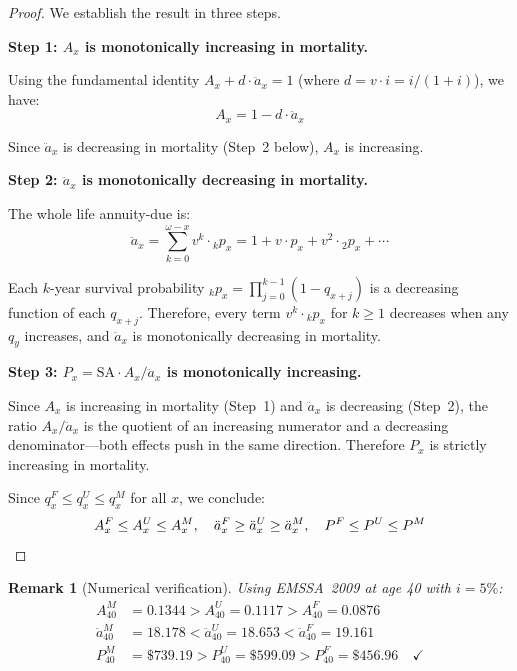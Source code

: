 \documentclass[12pt,a4paper]{article}
\newtheorem{remark}[definition]{Remark}
\newcommand{\qx}[1]{q_{#1}}
\newcommand{\Ax}[1]{A_{#1}}
\newcommand{\ax}[1]{\ddot{a}_{#1}}
\newcommand{\SA}{\text{SA}}
\begin{document}
\begin{proof}
We establish the result in three steps.

\textbf{Step 1: $\Ax{x}$ is monotonically increasing in mortality.}

Using the fundamental identity $\Ax{x} + d \cdot \ax{x} = 1$
(where $d = v \cdot i = i/(1+i)$), we have:
\begin{equation}
  \Ax{x} = 1 - d \cdot \ax{x}
\end{equation}

Since $\ax{x}$ is decreasing in mortality (Step~2 below), $\Ax{x}$ is increasing.

\textbf{Step 2: $\ax{x}$ is monotonically decreasing in mortality.}

The whole life annuity-due is:
\begin{equation}
  \ax{x} = \sum_{k=0}^{\omega - x} v^k \cdot {}_{k}p_x
  = 1 + v \cdot p_x + v^2 \cdot {}_{2}p_x + \cdots
\end{equation}

Each $k$-year survival probability ${}_{k}p_x = \prod_{j=0}^{k-1}(1 - \qx{x+j})$
is a decreasing function of each $\qx{x+j}$. Therefore, every term
$v^k \cdot {}_{k}p_x$ for $k \geq 1$ decreases when any $\qx{y}$ increases,
and $\ax{x}$ is monotonically decreasing in mortality.

\textbf{Step 3: $P_x = \SA \cdot \Ax{x} / \ax{x}$ is monotonically increasing.}

Since $\Ax{x}$ is increasing in mortality (Step~1) and $\ax{x}$ is decreasing
(Step~2), the ratio $\Ax{x} / \ax{x}$ is the quotient of an increasing
numerator and a decreasing denominator---both effects push in the same
direction. Therefore $P_x$ is strictly increasing in mortality.

Since $\qx{x}^F \leq \qx{x}^U \leq \qx{x}^M$ for all $x$, we conclude:
\begin{equation}
  \Ax{x}^F \leq \Ax{x}^U \leq \Ax{x}^M, \quad
  \ax{x}^F \geq \ax{x}^U \geq \ax{x}^M, \quad
  P^F \leq P^U \leq P^M \qedhere
\end{equation}
\end{proof}

\begin{remark}[Numerical verification]
Using EMSSA~2009 at age 40 with $i = 5\%$:
\begin{align*}
  \Ax{40}^M &= 0.1344 > \Ax{40}^U = 0.1117 > \Ax{40}^F = 0.0876 \\
  \ax{40}^M &= 18.178 < \ax{40}^U = 18.653 < \ax{40}^F = 19.161 \\
  P_{40}^M &= \$739.19 > P_{40}^U = \$599.09 > P_{40}^F = \$456.96 \quad \checkmark
\end{align*}
\end{remark}
\end{document}
